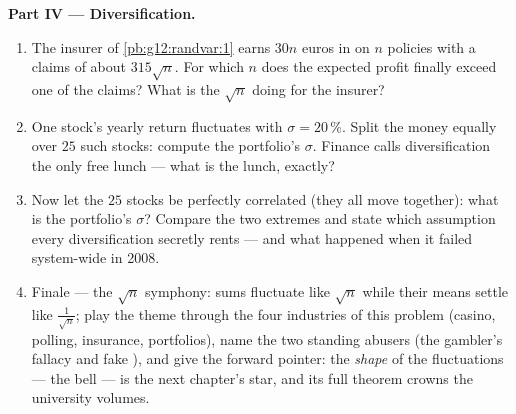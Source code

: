 \begin{problem}
\medskip
\noindent\textbf{Part IV --- Diversification.}
\begin{enumerate}[resume]
  \item The insurer of \cref{pb:g12:randvar:1} earns
        $30n$ euros in  on $n$ policies with a
        claims  of about $315\sqrt n$. For
        which $n$ does the expected profit finally exceed one
         of the claims? What is the
        $\sqrt n$ doing for the insurer?
  \item One stock's yearly return fluctuates with
        $\sigma = 20\,\%$. Split the money equally over $25$
        \emph{} such stocks: compute the
        portfolio's $\sigma$. Finance calls diversification
        the only free lunch --- what is the lunch, exactly?
  \item Now let the $25$ stocks be perfectly correlated (they
        all move together): what is the portfolio's $\sigma$?
        Compare the two extremes and state which assumption
        every diversification  secretly rents ---
        and what happened when it failed system-wide in 2008.
  \item Finale --- the $\sqrt n$ symphony: sums fluctuate like
        $\sqrt n$ while their means settle like
        $\frac{1}{\sqrt n}$; play the theme through the four
        industries of this problem (casino, polling, insurance,
        portfolios), name the two standing abusers (the
        gambler's fallacy and fake ), and give the
        forward pointer: the \emph{shape} of the fluctuations
        --- the bell --- is the next chapter's 
        star, and its full theorem crowns the university
        volumes.
\end{enumerate}
\end{problem}
